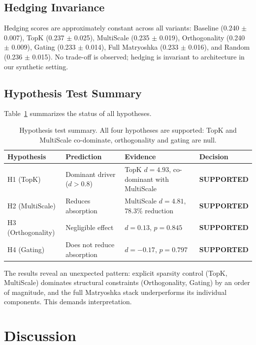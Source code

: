 \documentclass{article}
\begin{document}
\subsection{Hedging Invariance}

Hedging scores are approximately constant across all variants: Baseline (0.240 $\pm$ 0.007), TopK (0.237 $\pm$ 0.025), MultiScale (0.235 $\pm$ 0.019), Orthogonality (0.240 $\pm$ 0.009), Gating (0.233 $\pm$ 0.014), Full Matryoshka (0.233 $\pm$ 0.016), and Random (0.236 $\pm$ 0.015). No trade-off is observed; hedging is invariant to architecture in our synthetic setting.

\subsection{Hypothesis Test Summary}

Table~\ref{tab:hypotheses} summarizes the status of all hypotheses.

\begin{table}[t]
\caption{Hypothesis test summary. All four hypotheses are supported: TopK and MultiScale co-dominate, orthogonality and gating are null.}
\label{tab:hypotheses}
\centering
\footnotesize
\begin{tabular}{p{2.2cm}p{3.5cm}p{4.5cm}l}
\toprule
Hypothesis & Prediction & Evidence & Decision \\
\midrule
H1 (TopK) & Dominant driver ($d > 0.8$) & TopK $d = 4.93$, co-dominant with MultiScale & \textbf{SUPPORTED} \\
H2 (MultiScale) & Reduces absorption & MultiScale $d = 4.81$, 78.3\% reduction & \textbf{SUPPORTED} \\
H3 (Orthogonality) & Negligible effect & $d = 0.13$, $p = 0.845$ & \textbf{SUPPORTED} \\
H4 (Gating) & Does not reduce absorption & $d = -0.17$, $p = 0.797$ & \textbf{SUPPORTED} \\
\bottomrule
\end{tabular}
\end{table}

The results reveal an unexpected pattern: explicit sparsity control (TopK, MultiScale) dominates structural constraints (Orthogonality, Gating) by an order of magnitude, and the full Matryoshka stack underperforms its individual components. This demands interpretation.

\section{Discussion}
\end{document}
